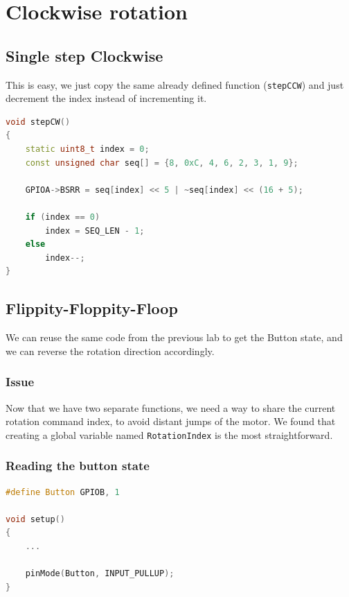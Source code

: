 \documentclass{article}
\begin{document}
\section{Clockwise rotation}

\subsection{Single step Clockwise}

This is easy, we just copy the same already defined function (\verb|stepCCW|) and just decrement the index instead of incrementing it.

\begin{lstlisting}[language=C++, caption={stepCW()}]
void stepCW()
{
    static uint8_t index = 0;
    const unsigned char seq[] = {8, 0xC, 4, 6, 2, 3, 1, 9};

    GPIOA->BSRR = seq[index] << 5 | ~seq[index] << (16 + 5);

    if (index == 0)
        index = SEQ_LEN - 1;
    else
        index--;
}
\end{lstlisting}

\subsection{Flippity-Floppity-Floop}
We can reuse the same code from the previous lab to get the Button state, and we can reverse the rotation direction accordingly.

\subsubsection{Issue}
Now that we have two separate functions, we need a way to share the current rotation command index, to avoid distant jumps of the motor. We found that creating a global variable named \verb|RotationIndex| is the most straightforward.

\subsubsection{Reading the button state}

\begin{lstlisting}[language=C++, caption={Button setup}]
#define Button GPIOB, 1

void setup()
{
    ...

    pinMode(Button, INPUT_PULLUP);
}

\end{lstlisting}
\end{document}

